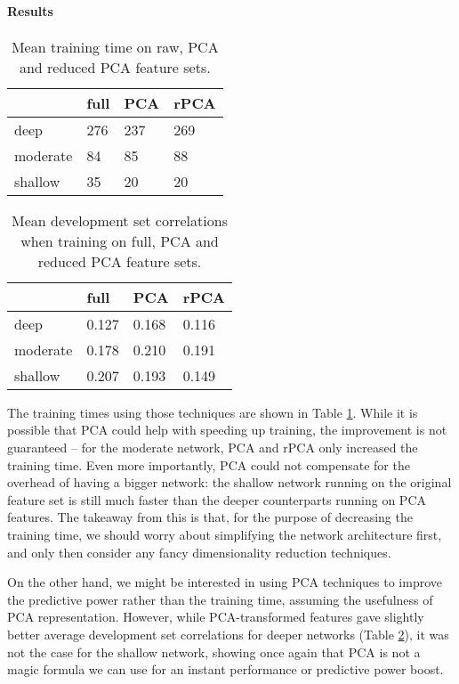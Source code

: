 \documentclass[10pt, twocolumn]{article}
\begin{document}

\paragraph{Results} 
\begin{table}[]
	\begin{tabularx}{\linewidth}{XXXX}
		\hline
				& \textbf{full} & \textbf{PCA} & \textbf{rPCA}\\ \hline
		deep    & 276   & 237  & 269 \\
		moderate  & 84 & 85 & 88 \\
		shallow & 35 & 20 & 20
		\end{tabularx}
\caption{Mean training time on raw, PCA and reduced PCA feature sets.}\label{g2}
\end{table}

\begin{table}[]
	\begin{tabularx}{\linewidth}{XXXX}
		\hline
				& \textbf{full} & \textbf{PCA} & \textbf{rPCA}\\ \hline
		deep    & 0.127   & 0.168  & 0.116 \\
		moderate  & 0.178 & 0.210 & 0.191 \\
		shallow & 0.207 & 0.193 & 0.149
		\end{tabularx}
\caption{Mean development set correlations when training on full, PCA and reduced PCA feature sets.}\label{g3}
\end{table}

The training times using those techniques are shown in Table \ref{g2}. While it is possible that PCA could help with speeding up training, the improvement is not guaranteed – for the moderate network, PCA and rPCA only increased the training time. Even more importantly, PCA could not compensate for the overhead of having a bigger network: the shallow network running on the original feature set is still much faster than the deeper counterparts running on PCA features. The takeaway from this is that, for the purpose of decreasing the training time, we should worry about simplifying the network architecture first, and only then consider any fancy dimensionality reduction techniques.

On the other hand, we might be interested in using PCA techniques to improve the predictive power rather than the training time, assuming the usefulness of PCA representation. However, while PCA-transformed features gave slightly better average development set correlations for deeper networks (Table \ref{g3}), it was not the case for the shallow network, showing once again that PCA is not a magic formula we can use for an instant performance or predictive power boost.
\end{document}

